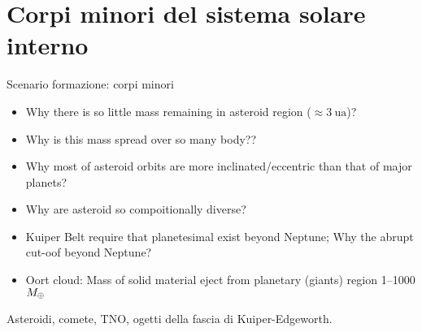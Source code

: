 \section{Corpi minori del sistema solare interno}

\begin{frame}{Scenario formazione: corpi minori}
\begin{itemize}
\item Why there is so little mass remaining in asteroid region ($\approx\SI{3}{\astronomicalunit}$)? 
\item Why is this mass spread over so many body??
\item Why most of asteroid orbits are more inclinated/eccentric than that of major planets?
\item Why are asteroid so compoitionally diverse?
\item Kuiper Belt require that planetesimal exist beyond Neptune; Why the abrupt cut-oof beyond Neptune?
\item Oort cloud: Mass of solid material eject from planetary (giants) region \numrange{1}{1000}$M_{\oplus}{}$
\end{itemize}

\end{frame}

\begin{wordonframe}{Asteroidi, comete, TNO, ogetti della fascia di Kuiper-Edgeworth.}

\end{wordonframe}

